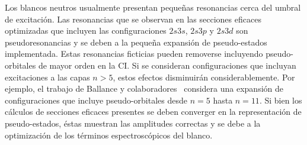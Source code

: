 Los blancos neutros usualmente presentan pequeñas resonancias cerca del 
umbral de excitación. Las resonancias que se observan en las secciones 
eficaces optimizadas que incluyen las configuraciones $2s3s$, $2s3p$ y 
$2s3d$ son pseudoresonancias y se deben a la pequeña expansión de 
pseudo-estados implementada. Estas resonancias ficticias pueden 
removerse incluyendo pseudo-orbitales de mayor orden en la CI. Si se 
consideran configuraciones que incluyan excitaciones a las capas $n>5$, 
estos efectos disminuirán considerablemente. Por ejemplo, el trabajo de 
Ballance y colaboradores~\cite{Be_Ballance:03} considera una expansión 
de configuraciones que incluye pseudo-orbitales desde $n=5$ hasta $n=11$.
Si bien los cálculos de secciones eficaces presentes se deben converger 
en la representación de pseudo-estados, éstas muestran las amplitudes 
correctas y se debe a la optimización de los términos espectroscópicos 
del blanco. 



